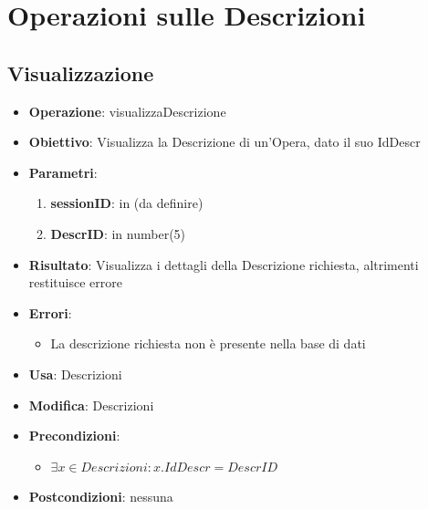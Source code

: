 \documentclass[a4paper,11pt]{article}
\begin{document}
\section{Operazioni sulle Descrizioni}

\subsection{Visualizzazione}
\begin{itemize}
	\item \textbf{Operazione}: visualizzaDescrizione
	\item \textbf{Obiettivo}: Visualizza la Descrizione di un'Opera, dato il suo IdDescr
	\item \textbf{Parametri}:
	\begin{enumerate}
		\item \textbf{sessionID}: in (da definire)
		\item \textbf{DescrID}: in number(5)
	\end{enumerate}
	\item \textbf{Risultato}: Visualizza i dettagli della Descrizione richiesta, altrimenti restituisce errore
	\item \textbf{Errori}: 
	\begin{itemize}
		\item La descrizione richiesta non è presente nella base di dati
	\end{itemize}
	\item \textbf{Usa}: Descrizioni
	\item \textbf{Modifica}: Descrizioni
	\item \textbf{Precondizioni}:
	\begin{itemize}
		\item $\exists x \in Descrizioni : x.IdDescr = DescrID$
	\end{itemize}
	\item \textbf{Postcondizioni}: nessuna
\end{itemize}

\end{document}
